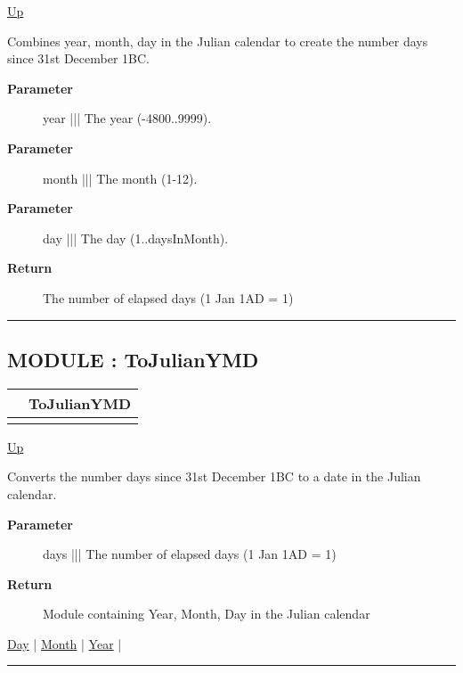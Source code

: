 \hyperlink{ecldoc:Date}{Up}

\par
Combines year, month, day in the Julian calendar to create the number days since 31st December 1BC.

\par
\begin{description}
\item [\textbf{Parameter}] year ||| The year (-4800..9999).
\item [\textbf{Parameter}] month ||| The month (1-12).
\item [\textbf{Parameter}] day ||| The day (1..daysInMonth).
\item [\textbf{Return}] The number of elapsed days (1 Jan 1AD = 1)
\end{description}

\rule{\textwidth}{0.4pt}
\subsection*{MODULE : ToJulianYMD}
\hypertarget{ecldoc:date.tojulianymd}{}

{\renewcommand{\arraystretch}{1.5}
\begin{tabularx}{\textwidth}{|>{\raggedright\arraybackslash}l|X|}
\hline
\hspace{0pt} & ToJulianYMD \\
\hline
\multicolumn{2}{|>{\raggedright\arraybackslash}X|}{\hspace{0pt}(Days\_t days)} \\
\hline
\end{tabularx}
}

\hyperlink{ecldoc:Date}{Up}

\par
Converts the number days since 31st December 1BC to a date in the Julian calendar.

\par
\begin{description}
\item [\textbf{Parameter}] days ||| The number of elapsed days (1 Jan 1AD = 1)
\item [\textbf{Return}] Module containing Year, Month, Day in the Julian calendar
\end{description}

\hyperlink{ecldoc:date.tojulianymd.result.day}{Day}  |
\hyperlink{ecldoc:date.tojulianymd.result.month}{Month}  |
\hyperlink{ecldoc:date.tojulianymd.result.year}{Year}  |

\rule{\textwidth}{0.4pt}

